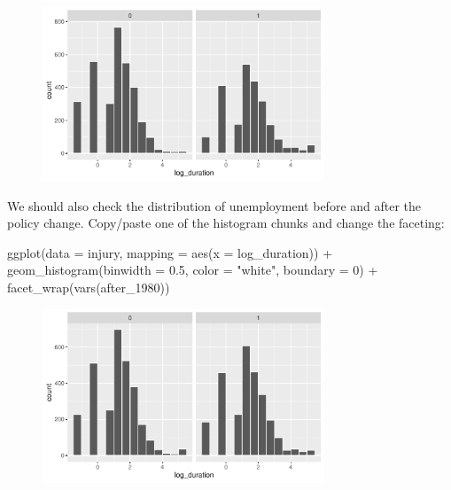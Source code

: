 \documentclass[
  letterpaper,
  DIV=11,
  numbers=noendperiod]{scrartcl}
\newenvironment{Shaded}{\begin{snugshade}}{\end{snugshade}}
\newcommand{\AttributeTok}[1]{\textcolor[rgb]{0.40,0.45,0.13}{#1}}
\newcommand{\DecValTok}[1]{\textcolor[rgb]{0.68,0.00,0.00}{#1}}
\newcommand{\FloatTok}[1]{\textcolor[rgb]{0.68,0.00,0.00}{#1}}
\newcommand{\FunctionTok}[1]{\textcolor[rgb]{0.28,0.35,0.67}{#1}}
\newcommand{\NormalTok}[1]{\textcolor[rgb]{0.00,0.23,0.31}{#1}}
\newcommand{\SpecialCharTok}[1]{\textcolor[rgb]{0.37,0.37,0.37}{#1}}
\newcommand{\StringTok}[1]{\textcolor[rgb]{0.13,0.47,0.30}{#1}}
\begin{document}
\begin{figure}[H]

{\centering \includegraphics[width=0.75\textwidth,height=\textheight]{DD_wooldridge_injury_files/figure-pdf/log-duration-histogram-1.pdf}

}

\end{figure}

We should also check the distribution of unemployment before and after
the policy change. Copy/paste one of the histogram chunks and change the
faceting:

\begin{Shaded}
\begin{Highlighting}[]
\FunctionTok{ggplot}\NormalTok{(}\AttributeTok{data =}\NormalTok{ injury, }\AttributeTok{mapping =} \FunctionTok{aes}\NormalTok{(}\AttributeTok{x =}\NormalTok{ log\_duration)) }\SpecialCharTok{+}
  \FunctionTok{geom\_histogram}\NormalTok{(}\AttributeTok{binwidth =} \FloatTok{0.5}\NormalTok{, }\AttributeTok{color =} \StringTok{"white"}\NormalTok{, }\AttributeTok{boundary =} \DecValTok{0}\NormalTok{) }\SpecialCharTok{+}
  \FunctionTok{facet\_wrap}\NormalTok{(}\FunctionTok{vars}\NormalTok{(after\_1980))}
\end{Highlighting}
\end{Shaded}

\begin{figure}[H]

{\centering \includegraphics[width=0.75\textwidth,height=\textheight]{DD_wooldridge_injury_files/figure-pdf/log-duration-before-after-histogram-1.pdf}

}

\end{figure}
\end{document}
